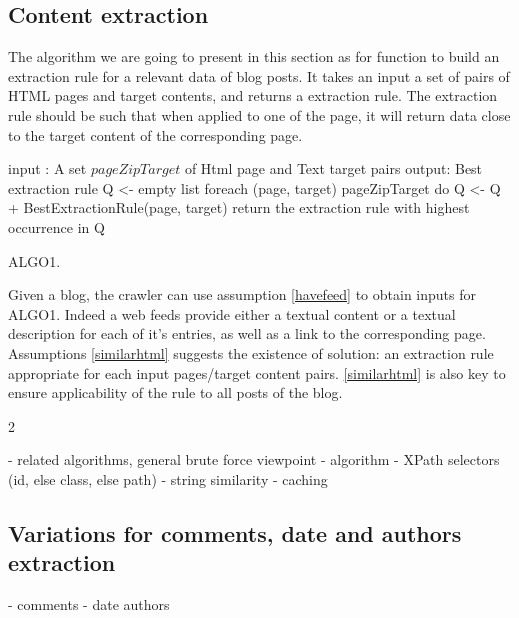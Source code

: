 \subsection{Content extraction}

The algorithm we are going to present in this section as for function to build an extraction rule for a relevant data of blog posts. It takes an input a set of pairs of HTML pages and target contents, and returns a extraction rule. The extraction rule should be such that when applied to one of the page, it will return data close to the target content of the corresponding page.

input : A set $pageZipTarget$ of Html page and Text target pairs
output: Best extraction rule
Q <- empty list
foreach (page, target) \in pageZipTarget do
  Q <- Q + BestExtractionRule(page, target)
return the extraction rule with highest occurrence in Q



ALGO1.

Given a blog, the crawler can use assumption \ref{havefeed} to obtain inputs for ALGO1. Indeed a web feeds provide either a textual content or a textual description for each of it's entries, as well as a link to the corresponding page. Assumptions \ref{similarhtml} suggests the existence of solution: an extraction rule appropriate for each input pages/target content pairs. \ref{similarhtml} is also key to ensure applicability of the rule to all posts of the blog.

2

- related algorithms, general brute force viewpoint
- algorithm
- XPath selectors (id, else class, else path)
- string similarity
- caching


\subsection{Variations for comments, date and authors extraction}
- comments
- date authors
